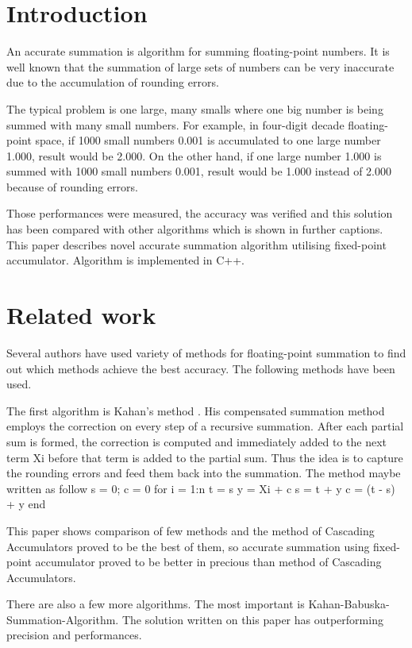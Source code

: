 \documentclass[conference]{IEEEtran}
\begin{document}
%
\IEEEpeerreviewmaketitle


\section{Introduction}
An accurate summation \cite{Higham} is algorithm for summing 
floating-point numbers. It is well known that the summation 
of large sets of numbers can be very inaccurate due
to the accumulation of rounding errors. 
\par
The typical problem is one large, many smalls \cite{} 
where one big number is being summed with many small numbers. 
For example, in four-digit decade floating-point space,
if 1000 small numbers 0.001 is accumulated to one large 
number 1.000, result would be 2.000. On the other hand,
if one large number 1.000 is summed with 1000 small numbers 0.001,
result would be 1.000 instead of 2.000 because of rounding errors.
\par
Those performances were measured, the accuracy was verified and this 
solution has been compared with other algorithms which is 
shown in further captions. This paper describes novel accurate 
summation algorithm utilising fixed-point accumulator.
Algorithm is implemented in C++.


\section{Related work}
\label{sec:related_work}
Several authors have used variety of methods for floating-point summation to find out which methods achieve the best accuracy. 
The following methods have been used. 
\par
The first algorithm is Kahan's method \cite{Kahan}. 
His compensated summation method employs the correction 
on every step of a recursive summation. After each partial 
sum is formed, the correction is computed and immediately added 
to the next term Xi before that term is added to the partial
sum. Thus the idea is to capture the rounding errors and feed 
them back into the summation. The method maybe written as follow
s = 0; c = 0 
for i = 1:n
	t = s
	y = Xi + c 
	s = t + y
	c = (t - s) + y
end
\par 
This paper shows comparison of few methods and the method of 
Cascading Accumulators \cite{The method of Cascading Accumulators}
proved to be the best of them, so accurate summation using
fixed-point accumulator proved to be better in precious 
than method of Cascading Accumulators.
\par
There are also a few more algorithms. The most important is 
Kahan-Babuska-Summation-Algorithm\cite{}. The solution written on this
paper has outperforming precision and performances.
\end{document}
